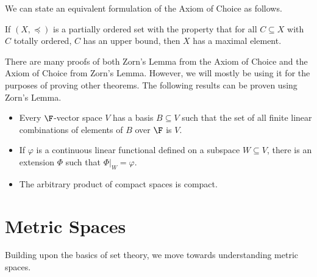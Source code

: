 We can state an equivalent formulation of the Axiom of Choice as follows.
\begin{theorem}
  If $\left(X,\preceq\right)$ is a partially ordered set with the property that for all $C\subseteq X$ with $C$ totally ordered, $C$ has an upper bound, then $X$ has a maximal element.
\end{theorem}
There are many proofs of both Zorn's Lemma from the Axiom of Choice and the Axiom of Choice from Zorn's Lemma. However, we will mostly be using it for the purposes of proving other theorems. The following results can be proven using Zorn's Lemma.
\begin{example}
  \begin{itemize}
    \item Every $\F$-vector space $V$ has a basis $B\subseteq V$ such that the set of all finite linear combinations of elements of $B$ over $\F$ is $V$.
    \item If $\varphi$ is a continuous linear functional defined on a subspace $W\subseteq V$, there is an extension $\Phi$ such that $\Phi|_{W} = \varphi$. %
    \item The arbitrary product of compact spaces is compact. %
  \end{itemize}
\end{example}
\section{Metric Spaces}%
Building upon the basics of set theory, we move towards understanding metric spaces.
